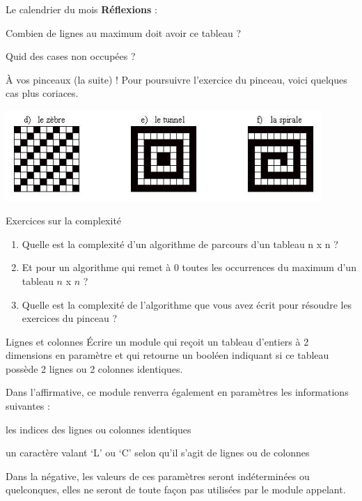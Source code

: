 \begin{Exercice}{Le calendrier du mois}
	\textbf{Réflexions} :

	\begin{liste}
	\item Combien de lignes au maximum doit avoir ce tableau ?
	\item Quid des cases non occupées ?
	\end{liste}
\end{Exercice}

\begin{Exercice}{À vos pinceaux (la suite) !}
	Pour poursuivre l'exercice du pinceau, 
	voici quelques cas plus coriaces.
	
	\begin{center}
	\includegraphics[width=0.9\textwidth]{image/tab2d-ex-zts}
	\end{center}
\end{Exercice}

\begin{Exercice}{Exercices sur la complexité}

	\begin{enumerate}[label=\alph*)]
	\item 
		Quelle est la complexité d’un algorithme de parcours
		d'un tableau n x n ?
	\item
		Et pour un algorithme qui remet à 0 toutes les
		occurrences du maximum d'un tableau $n$ x $n$ ?
	\item 
		Quelle est la complexité de
		l'algorithme que vous avez écrit pour résoudre les
		exercices du pinceau ?
	\end{enumerate}
\end{Exercice}

\begin{Exercice}{Lignes et colonnes}
	Écrire un module qui reçoit un tableau d’entiers à 2 dimensions en paramètre 
	et qui retourne un booléen indiquant si ce tableau 
	possède 2 lignes ou 2 colonnes identiques.
	
	Dans l’affirmative, 
	ce module renverra également en paramètres les informations suivantes :
	
	\begin{liste}
	\item les indices des lignes ou colonnes identiques
	\item un caractère valant ‘L’ ou ‘C’ selon qu’il s’agit de lignes ou de
	colonnes
	\end{liste}
	
	Dans la négative, les valeurs de ces paramètres seront indéterminées ou
	quelconques, elles ne seront de toute façon pas utilisées par le module
	appelant.
\end{Exercice}
